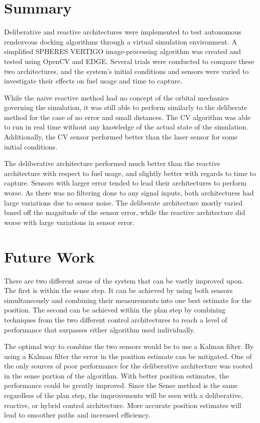 \documentclass[journal, 10pt]{IEEEtran}
\begin{document}
\section{Summary}
Deliberative and reactive architectures were implemented to test autonomous rendezvous docking algorithms through a virtual simulation environment. A simplified SPHERES VERTIGO image-processing algorithm was created and tested using OpenCV and EDGE. Several trials were conducted to compare these two architectures, and the system's initial conditions and sensors were varied to investigate their effects on fuel usage and time to capture.

While the naive reactive method had no concept of the orbital mechanics governing the simulation, it was still able to perform similarly to the deliberate method for the case of no error and small distances. The CV algorithm was able to run in real time without any knowledge of the actual state of the simulation. Additionally, the CV sensor performed better than the laser sensor for some initial conditions.

The deliberative architecture performed much better than the reactive architecture with respect to fuel usage, and slightly better with regards to time to capture. Sensors with larger error tended to lead their architectures to perform worse. As there was no filtering done to any signal inputs, both architectures had large variations due to sensor noise. The deliberate architecture mostly varied based off the magnitude of the sensor error, while the reactive architecture did worse with large variations in sensor error. 

\section{Future Work}
There are two different areas of the system that can be vastly improved upon.  The first is within the sense step.  It can be achieved by using both sensors simultaneously and combining their measurements into one best estimate for the position.  The second can be achieved within the plan step by combining techniques from the two different control architectures to reach a level of performance that surpasses either algorithm used individually.

The optimal way to combine the two sensors would be to use a Kalman filter.  By using a Kalman filter the error in the position estimate can be mitigated.  One of the only sources of poor performance for the deliberative architecture was rooted in the sense portion of the algorithm.  With better position estimates, the performance could be greatly improved.  Since the Sense method is the same regardless of the plan step, the improvements will be seen with a deliberative, reactive, or hybrid control architecture.  More accurate position estimates will lead to smoother paths and increased efficiency.
\end{document}
